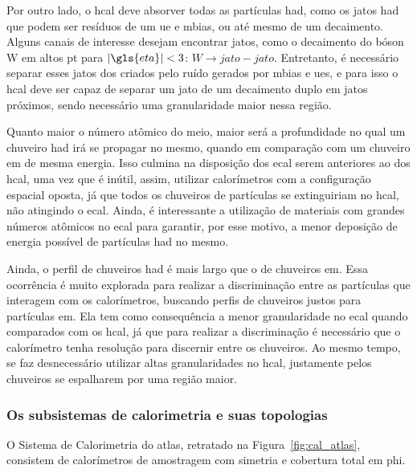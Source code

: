 Por outro lado, o \gls{hcal} deve absorver todas as partículas \gls{had}, como os jatos
\gls{had} que podem ser resíduos de um \gls{ue} e \gls{mbias}, ou até mesmo de
um decaimento. Alguns canais de interesse desejam encontrar jatos, como 
o decaimento do bóson W em altos \gls{pt} para $|\gls{eta}|<3$: $W\rightarrow jato-jato$. 
Entretanto, é necessário separar esses jatos dos criados pelo ruído 
gerados por \gls{mbias} e \glspl{ue}, e para isso o \gls{hcal} deve ser capaz de
separar um jato de um decaimento duplo em jatos próximos, sendo
necessário uma granularidade maior nessa região.

Quanto maior o número atômico do meio, maior será a profundidade no qual um
chuveiro \gls{had} irá se propagar no mesmo, quando em comparação com um chuveiro
\gls{em} de mesma energia. Isso culmina na disposição
dos \gls{ecal} serem anteriores ao dos \gls{hcal}, uma vez que é inútil, assim, utilizar calorímetros com a 
configuração espacial oposta, já que todos os chuveiros de partículas se
extinguiriam no \gls{hcal}, não atingindo o \gls{ecal}. Ainda, é interessante a
utilização de materiais com grandes números atômicos no \gls{ecal} para
garantir, por esse motivo, a menor deposição de energia possível de partículas
\gls{had} no mesmo.

Ainda, o perfil de chuveiros \gls{had} é mais largo que o de chuveiros
\gls{em}. Essa ocorrência é muito explorada para realizar a discriminação 
entre as partículas que interagem com os calorímetros, buscando perfis de chuveiros
justos para partículas \gls{em}. Ela tem como consequência 
a menor granularidade no \gls{ecal} quando comparados com os \gls{hcal}, já que
para realizar a discriminação é necessário que o calorímetro tenha resolução
para discernir entre os chuveiros. Ao mesmo tempo, se faz desnecessário
utilizar altas granularidades no \gls{hcal}, justamente pelos chuveiros se
espalharem por uma região maior.


\subsubsection{Os subsistemas de calorimetria e suas topologias}
\label{sssec:cal_estrutura}

O Sistema de Calorimetria \cite{cal_tdr,ecal_tdr,hcal_tdr} do \gls{atlas}, retratado na
Figura~\ref{fig:cal_atlas}, consistem de calorímetros de amostragem com 
simetria e cobertura total em \gls{phi}.

